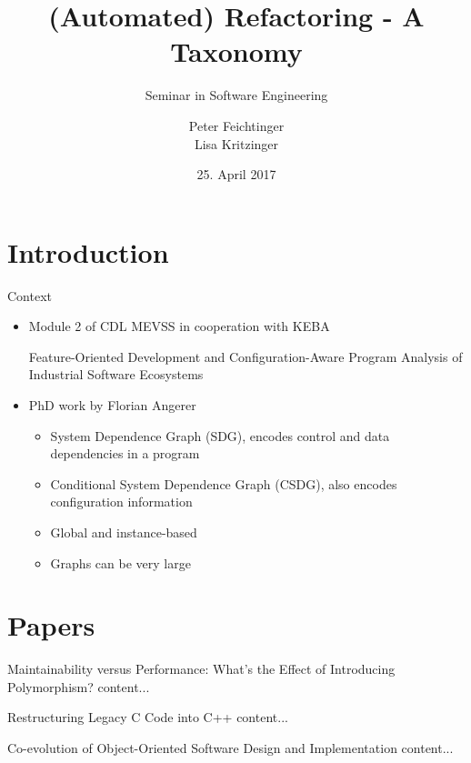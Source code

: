 \documentclass{beamer}
\title[Refactoring]{(Automated) Refactoring - A Taxonomy}
\subtitle{Seminar in Software Engineering}
\institute[]{Institute for Software Systems Engineering\\Johannes Kepler University Linz}
\author[Feichtinger, Kritzinger]{Peter Feichtinger\texorpdfstring{\\}{, }Lisa Kritzinger} %
\date{25. April 2017}
\begin{document}
\begin{frame}
  \titlepage
\end{frame}



\section{Introduction}  %

\begin{frame}{Context}
  \begin{itemize}
    \item Module 2 of CDL MEVSS in cooperation with KEBA
      
      Feature-Oriented Development and Configuration-Aware Program Analysis of Industrial Software Ecosystems
    \pause
    \item PhD work by Florian Angerer
    \begin{itemize}
      \item System Dependence Graph (SDG), encodes control and data dependencies in a program
      \pause
      \item Conditional System Dependence Graph (CSDG), also encodes configuration information
      \pause
      \item Global and instance-based
      \item Graphs can be very large
    \end{itemize}
  \end{itemize}
\end{frame}

\section{Papers}

\begin{frame}{Maintainability versus Performance: What's the Effect of Introducing Polymorphism?}
  content...
\end{frame}

\begin{frame}{Restructuring Legacy C Code into C++}
  content...
\end{frame}

\begin{frame}{Co-evolution of Object-Oriented Software Design and Implementation}
  content...
\end{frame}
\end{document}
